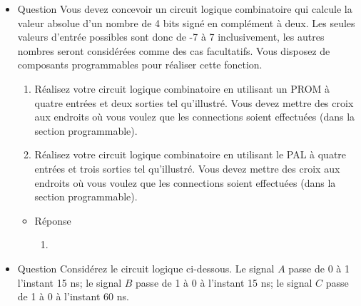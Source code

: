 \documentclass[letter, oneside]{book}
\begin{document}
\begin{itemize}
\item Question
\label{sec:orgbc0c8ce}
Vous devez concevoir un circuit logique combinatoire qui calcule la
valeur absolue d'un nombre de 4 bits signé en complément à deux. Les
seules valeurs d'entrée possibles sont donc de -7 à 7 inclusivement,
les autres nombres seront considérées comme des cas facultatifs. Vous
disposez de composants programmables pour réaliser cette fonction.

\begin{enumerate}
\item Réalisez votre circuit logique combinatoire en utilisant un PROM à
quatre entrées et deux sorties tel qu'illustré.  Vous devez mettre
des croix aux endroits où vous voulez que les connections soient
effectuées (dans la section programmable).

\begin{center}

\end{center}

\item Réalisez votre circuit logique combinatoire en utilisant le PAL à
quatre entrées et trois sorties tel qu'illustré.  Vous devez mettre
des croix aux endroits où vous voulez que les connections soient
effectuées (dans la section programmable).

\begin{center}

\end{center}
\end{enumerate}

\begin{itemize}
\item Réponse
\label{sec:org08c1f79}
\begin{enumerate}
\item \begin{center}

\end{center}
\end{enumerate}
\end{itemize}

\item Question
\label{sec:org8bac9d3}
Considérez le circuit logique ci-dessous. Le signal \(A\) passe de 0 à 1
l'instant 15 ns; le signal \(B\) passe de 1 à 0 à l'instant 15 ns; le
signal \(C\) passe de 1 à 0 à l'instant 60 ns.

\begin{center}

\end{center}


\end{itemize}
\end{document}
